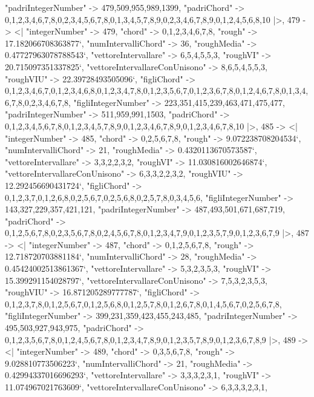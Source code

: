 \documentclass[
]{article}
\begin{document}
\begin{DatasetVerbatim}
    "padriIntegerNumber" -> {479,509,955,989,1399},
    "padriChord" -> {{0,1,2,3,4,6,7,8},{0,2,3,4,5,6,7,8},{0,1,3,4,5,7,8,9},{0,2,3,4,6,7,8,9},{0,1,2,4,5,6,8,10}}
  |>,
  479 -> <|
    "integerNumber" -> 479,
    "chord" -> {0,1,2,3,4,6,7,8},
    "rough" -> 17.182066708363877`,
    "numIntervalliChord" -> 36,
    "roughMedia" -> 0.47727963078788543`,
    "vettoreIntervallare" -> {6,5,4,5,5,3},
    "roughVI" -> 20.715097351337825`,
    "vettoreIntervallareConUnisono" -> {8,6,5,4,5,5,3},
    "roughVIU" -> 22.39728493505096`,
    "figliChord" -> {{0,1,2,3,4,6,7},{0,1,2,3,4,6,8},{0,1,2,3,4,7,8},{0,1,2,3,5,6,7},{0,1,2,3,6,7,8},{0,1,2,4,6,7,8},{0,1,3,4,6,7,8},{0,2,3,4,6,7,8}},
    "figliIntegerNumber" -> {223,351,415,239,463,471,475,477},
    "padriIntegerNumber" -> {511,959,991,1503},
    "padriChord" -> {{0,1,2,3,4,5,6,7,8},{0,1,2,3,4,5,7,8,9},{0,1,2,3,4,6,7,8,9},{0,1,2,3,4,6,7,8,10}}
  |>,
  485 -> <|
    "integerNumber" -> 485,
    "chord" -> {0,2,5,6,7,8},
    "rough" -> 9.072238708204534`,
    "numIntervalliChord" -> 21,
    "roughMedia" -> 0.4320113670573587`,
    "vettoreIntervallare" -> {3,3,2,2,3,2},
    "roughVI" -> 11.030816002646874`,
    "vettoreIntervallareConUnisono" -> {6,3,3,2,2,3,2},
    "roughVIU" -> 12.292456690431724`,
    "figliChord" -> {{0,1,2,3,7},{0,1,2,6,8},{0,2,5,6,7},{0,2,5,6,8},{0,2,5,7,8},{0,3,4,5,6}},
    "figliIntegerNumber" -> {143,327,229,357,421,121},
    "padriIntegerNumber" -> {487,493,501,671,687,719},
    "padriChord" -> {{0,1,2,5,6,7,8},{0,2,3,5,6,7,8},{0,2,4,5,6,7,8},{0,1,2,3,4,7,9},{0,1,2,3,5,7,9},{0,1,2,3,6,7,9}}
  |>,
  487 -> <|
    "integerNumber" -> 487,
    "chord" -> {0,1,2,5,6,7,8},
    "rough" -> 12.718720703881184`,
    "numIntervalliChord" -> 28,
    "roughMedia" -> 0.45424002513861367`,
    "vettoreIntervallare" -> {5,3,2,3,5,3},
    "roughVI" -> 15.399291154028797`,
    "vettoreIntervallareConUnisono" -> {7,5,3,2,3,5,3},
    "roughVIU" -> 16.871205289777787`,
    "figliChord" -> {{0,1,2,3,7,8},{0,1,2,5,6,7},{0,1,2,5,6,8},{0,1,2,5,7,8},{0,1,2,6,7,8},{0,1,4,5,6,7},{0,2,5,6,7,8}},
    "figliIntegerNumber" -> {399,231,359,423,455,243,485},
    "padriIntegerNumber" -> {495,503,927,943,975},
    "padriChord" -> {{0,1,2,3,5,6,7,8},{0,1,2,4,5,6,7,8},{0,1,2,3,4,7,8,9},{0,1,2,3,5,7,8,9},{0,1,2,3,6,7,8,9}}
  |>,
  489 -> <|
    "integerNumber" -> 489,
    "chord" -> {0,3,5,6,7,8},
    "rough" -> 9.028810773506223`,
    "numIntervalliChord" -> 21,
    "roughMedia" -> 0.42994337016696293`,
    "vettoreIntervallare" -> {3,3,3,2,3,1},
    "roughVI" -> 11.074967021763609`,
    "vettoreIntervallareConUnisono" -> {6,3,3,3,2,3,1},

\end{DatasetVerbatim}
\end{document}
